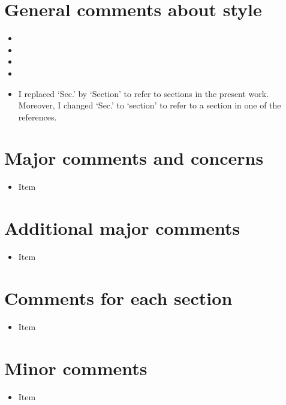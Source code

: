 \documentclass{article}
\begin{document}
\section*{General comments about style}
\begin{itemize}
\item
\item
\item
\item
\item I replaced `Sec.' by `Section' to refer to sections in the present work.
Moreover, I changed `Sec.' to `section' to refer to a section in one of the references.
\end{itemize}


\section*{Major comments and concerns}
\begin{itemize}
\item Item
\end{itemize}


\section*{Additional major comments}
\begin{itemize}
\item Item
\end{itemize}


\section*{Comments for each section}
\begin{itemize}
\item Item
\end{itemize}



\section*{Minor comments}
\begin{itemize}
\item Item
\end{itemize}
\end{document}
